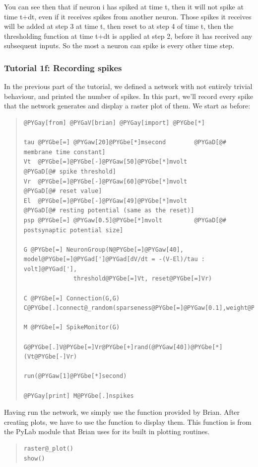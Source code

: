 \documentclass[letterpaper,10pt,english]{manual}
\begin{document}
You can see then that if neuron i has spiked at time t, then it
will not spike at time t+dt, even if it receives spikes from
another neuron. Those spikes it receives will be added at step
3 at time t, then reset to  at step 4 of time t, then the
thresholding function at time t+dt is applied at step 2, before
it has received any subsequent inputs. So the most a neuron
can spike is every other time step.

\resetcurrentobjects


\subsubsection{Tutorial 1f: Recording spikes}

In the previous part of the tutorial, we defined a network with
not entirely trivial behaviour, and printed the number of spikes.
In this part, we'll record every spike that the network generates
and display a raster plot of them. We start as before:
\begin{quote}

\begin{Verbatim}[commandchars=@\[\]]
@PYGay[from] @PYGaV[brian] @PYGay[import] @PYGbe[*]

tau @PYGbe[=] @PYGaw[20]@PYGbe[*]msecond        @PYGaD[@# membrane time constant]
Vt  @PYGbe[=]@PYGbe[-]@PYGaw[50]@PYGbe[*]mvolt          @PYGaD[@# spike threshold]
Vr  @PYGbe[=]@PYGbe[-]@PYGaw[60]@PYGbe[*]mvolt          @PYGaD[@# reset value]
El  @PYGbe[=]@PYGbe[-]@PYGaw[49]@PYGbe[*]mvolt          @PYGaD[@# resting potential (same as the reset)]
psp @PYGbe[=] @PYGaw[0.5]@PYGbe[*]mvolt         @PYGaD[@# postsynaptic potential size]

G @PYGbe[=] NeuronGroup(N@PYGbe[=]@PYGaw[40], model@PYGbe[=]@PYGad[']@PYGad[dV/dt = -(V-El)/tau : volt]@PYGad['],
              threshold@PYGbe[=]Vt, reset@PYGbe[=]Vr)

C @PYGbe[=] Connection(G,G)
C@PYGbe[.]connect@_random(sparseness@PYGbe[=]@PYGaw[0.1],weight@PYGbe[=]psp)

M @PYGbe[=] SpikeMonitor(G)

G@PYGbe[.]V@PYGbe[=]Vr@PYGbe[+]rand(@PYGaw[40])@PYGbe[*](Vt@PYGbe[-]Vr)

run(@PYGaw[1]@PYGbe[*]second)

@PYGay[print] M@PYGbe[.]nspikes
\end{Verbatim}
\end{quote}

Having run the network, we simply use the \hyperlink{brian.raster_plot}{} function
provided by Brian. After creating plots, we have to use the
 function to display them. This function is from the
PyLab module that Brian uses for its built in plotting
routines.
\begin{quote}

\begin{Verbatim}[commandchars=@\[\]]
raster@_plot()
show()
\end{Verbatim}
\end{quote}
\end{document}
